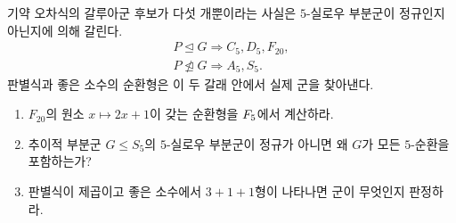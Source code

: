 \begin{keyidea}
기약 오차식의 갈루아군 후보가 다섯 개뿐이라는 사실은 $5$-실로우 부분군이 정규인지 아닌지에 의해 갈린다.
\[
  \boxed{
  \begin{array}{c}
  P\trianglelefteq G
  \Rightarrow C_5,D_5,F_{20},\\[2pt]
  P\not\trianglelefteq G
  \Rightarrow A_5,S_5.
  \end{array}}
\]
판별식과 좋은 소수의 순환형은 이 두 갈래 안에서 실제 군을 찾아낸다.
\end{keyidea}

\begin{checkpoint}
\begin{enumerate}[label=(\alph*)]
  \item $F_{20}$의 원소 $x\mapsto2x+1$이 갖는 순환형을 $F_5$에서 계산하라.
  \item 추이적 부분군 $G\le S_5$의 $5$-실로우 부분군이 정규가 아니면 왜 $G$가 모든 $5$-순환을 포함하는가?
  \item 판별식이 제곱이고 좋은 소수에서 $3+1+1$형이 나타나면 군이 무엇인지 판정하라.
\end{enumerate}
\end{checkpoint}
